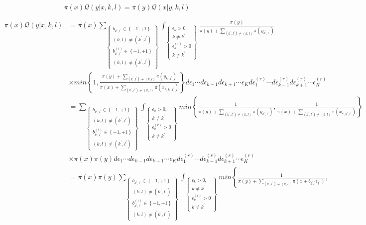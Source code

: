 \begin{equation} \label{eq:identity}
\pi (x) \mathcal{Q}(y | x, k, l) = \pi(y) \mathcal{Q}(x | y, k, l) 
\end{equation}

\begin{align*}
\pi(x) \mathcal{Q}(y | x, k, l)  & = \pi (x) \sum_{\left \{ \substack{b_{k^{'},l^{'}} \in \left \{-1,+1 \right \} \\
(k,l) \neq (k^{'}, l^{'}) \\ b^{(r)}_{k^{'},l^{'}} \in \left \{-1,+1 \right \} \\ (k,l) \neq (k^{'}, l^{'})}  \right \}} \int_{ \left \{ \substack{\epsilon_k > 0,\\ k \neq k^{'}  \\  \epsilon^{(r)}_k > 0 \\ k \neq k^{'}}\right \}}   \frac{\pi(y)}{\pi(y) + \sum_{(k^{'},l^{'}) \neq (k,l)} \pi(y_{k^{'},l^{'}})}   \\
& \times min \left \{ 1, \frac{\pi(y) + \sum_{(k^{'},l^{'}) \neq (k,l)} \pi(y_{k^{'},l^{'}})} {\pi(x) + \sum_{(k^{'},l^{'}) \neq (k,l)} \pi(x_{*, k^{'},l^{'}})} \right \} d \epsilon_1 \cdots d \epsilon_{k-1} d \epsilon_{k+1} \cdots \epsilon_{K} d \epsilon^{(r)}_1 \cdots d \epsilon^{(r)}_{k-1} d \epsilon^{(r)}_{k+1} \cdots \epsilon^{(r)}_{K} \\
& =  \sum_{\left \{ \substack{b_{k^{'},l^{'}} \in \left \{-1,+1 \right \} \\
(k,l) \neq (k^{'}, l^{'}) \\ b^{(r)}_{k^{'},l^{'}} \in \left \{-1,+1 \right \} \\ (k,l) \neq (k^{'}, l^{'})}  \right \}} \int_{ \left \{ \substack{\epsilon_k > 0,\\ k \neq k^{'}  \\  \epsilon^{(r)}_k > 0 \\ k \neq k^{'}}\right \}} min \left \{ \frac{1}{\pi(y) + \sum_{(k^{'},l^{'}) \neq (k,l)} \pi(y_{k^{'},l^{'}})}, \frac{1}{\pi(x) + \sum_{(k^{'},l^{'}) \neq (k,l)} \pi(x_{*, k^{'},l^{'}})} \right \}  \\
& \times \pi(x) \pi(y)  d \epsilon_1 \cdots d \epsilon_{k-1} d \epsilon_{k+1} \cdots \epsilon_{K} d \epsilon^{(r)}_1 \cdots d \epsilon^{(r)}_{k-1} d \epsilon^{(r)}_{k+1} \cdots \epsilon^{(r)}_{K} \\
& =  \pi(x) \pi(y)  \sum_{\left \{ \substack{b_{k^{'},l^{'}} \in \left \{-1,+1 \right \} \\
(k,l) \neq (k^{'}, l^{'}) \\ b^{(r)}_{k^{'},l^{'}} \in \left \{-1,+1 \right \} \\ (k,l) \neq (k^{'}, l^{'})}  \right \}} \int_{ \left \{ \substack{\epsilon_k > 0,\\ k \neq k^{'}  \\  \epsilon^{(r)}_k > 0 \\ k \neq k^{'}}\right \}} min \left \{ \frac{1}{\pi(y) + \sum_{(k^{'},l^{'}) \neq (k,l)} \pi(x+b_{k^{'}l^{'}}\epsilon_{k^{'}})},  \right . \\

\end{align*}
